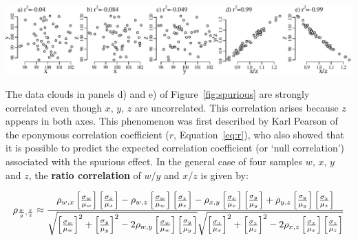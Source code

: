 \begin{enumerate}
\noindent\begin{minipage}[t][][b]{\textwidth-27pt}
\includegraphics[width=\textwidth]{../figures/spurious.pdf}
  \label{fig:spurious}
\end{minipage}

The data clouds in panels d) and e) of Figure~\ref{fig:spurious} are
strongly correlated even though $x$, $y$, $z$ are uncorrelated.  This
correlation arises because $z$ appears in both axes.  This phenomenon
was first described by Karl Pearson of the eponymous correlation
coefficient ($r$, Equation~\ref{eq:r}), who also showed that it is
possible to predict the expected correlation coefficient (or `null
correlation') associated with the spurious effect. In the general case
of four samples $w$, $x$, $y$ and $z$, the \textbf{ratio correlation}
of $w/y$ and $x/z$ is given by:

\begin{equation}
  \noindent \rho_{\frac{w}{y},\frac{x}{z}} \approx
  \frac{\rho_{w,x}\left[\frac{\sigma_w}{\mu_w}\right]
    \left[\frac{\sigma_x}{\mu_x}\right] -
    \rho_{w,z}\left[\frac{\sigma_w}{\mu_w}\right]
    \left[\frac{\sigma_z}{\mu_z}\right] -
    \rho_{x,y}\left[\frac{\sigma_x}{\mu_x}\right]
    \left[\frac{\sigma_y}{\mu_y}\right] +
    \rho_{y,z}\left[\frac{\sigma_y}{\mu_y}\right]
    \left[\frac{\sigma_z}{\mu_z}\right]
  }{
    \sqrt{\left[\frac{\sigma_w}{\mu_w}\right]^2 +
      \left[\frac{\sigma_y}{\mu_y}\right]^2 -
      2 \rho_{w,y}\left[\frac{\sigma_w}{\mu_w}\right]
      \left[\frac{\sigma_y}{\mu_y}\right]}
    \sqrt{\left[\frac{\sigma_x}{\mu_x}\right]^2 +
      \left[\frac{\sigma_z}{\mu_z}\right]^2 -
      2 \rho_{x,z}\left[\frac{\sigma_x}{\mu_x}\right]
      \left[\frac{\sigma_z}{\mu_z}\right]
    }
  }
  \label{eq:spurious}
\end{equation}


\end{enumerate}
